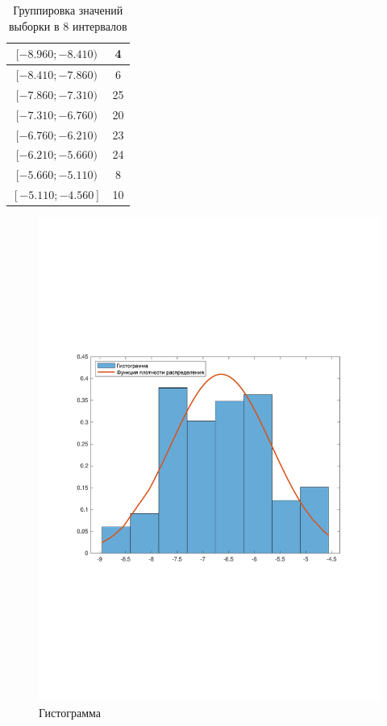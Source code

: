 \setlength\extrarowheight{4pt}
\begin{table}[H]
    \centering
    \begin{tabular}{|c|c|}
        \hline
        $[-8.960; -8.410)$ & 4 \\
        \hline
        $[-8.410; -7.860)$ & 6 \\
        \hline
        $[-7.860; -7.310)$ & 25 \\
        \hline
        $[-7.310; -6.760)$ & 20 \\
        \hline
        $[-6.760; -6.210)$ & 23 \\
        \hline
        $[-6.210; -5.660)$ & 24 \\
        \hline
        $[-5.660; -5.110)$ & 8 \\
        \hline
        $[-5.110; -4.560]$ & 10 \\
        \hline
    \end{tabular}
    \caption{Группировка значений выборки в 8 интервалов}
\end{table}

\begin{figure}[H]
    \centering
    \includegraphics[trim=0.5cm 9cm 0.5cm 8cm]{img/histogram.pdf}
    \caption{Гистограмма}
\end{figure}

